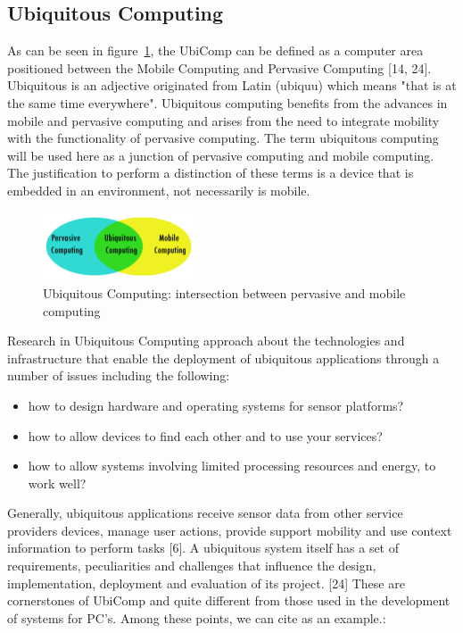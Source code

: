 \documentclass{acm_proc_article-sp}
\begin{document}
\subsection{Ubiquitous Computing}
As can be seen in figure~\ref{fig:ubiq}, the UbiComp can be defined as a computer area positioned between the Mobile Computing and Pervasive Computing [14, 24]. Ubiquitous is an adjective originated from Latin (ubiquu) which means "that is at the same time everywhere". Ubiquitous computing benefits from the advances in mobile and pervasive computing and arises from the need to integrate mobility with the functionality of pervasive computing. The term ubiquitous computing will be used here as a junction of pervasive computing and mobile computing. The justification to perform a distinction of these terms is a device that is embedded in an environment, not necessarily is mobile.
\begin{figure}[h]
    \includegraphics[width=0.4\textwidth,natwidth=610,natheight=642]{pictures/ubiq.png}
    \caption{Ubiquitous Computing: intersection between pervasive and mobile computing}
    \label{fig:ubiq}
\end{figure}
\newline
\newline
Research in Ubiquitous Computing approach about the technologies and infrastructure that enable the deployment of ubiquitous applications through a number of issues including the following:

\begin{itemize}
\item how to design hardware and operating systems for sensor platforms?
\item how to allow devices to find each other and to use your services?
\item how to allow systems involving limited processing resources and energy, to work well?
\end{itemize}

Generally, ubiquitous applications receive sensor data from other service providers devices, manage user actions, provide support mobility and use context information to perform tasks [6]. A ubiquitous system itself has a set of requirements, peculiarities and challenges that influence the design, implementation, deployment and evaluation of its project. [24] These are cornerstones of UbiComp and quite different from those used in the development of systems for PC’s. Among these points, we can cite as an example.:
\end{document}
